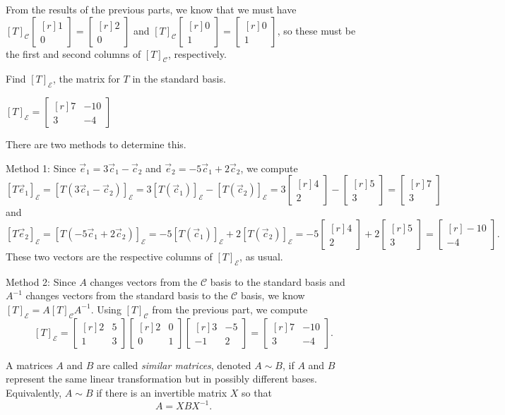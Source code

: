 \documentclass{problemset}
\newcommand{\xhat}{{\vec e_1}}
\newcommand{\yhat}{{\vec e_2}}
\newcommand{\mat}[1]{\begin{bmatrix*}[r]#1\end{bmatrix*}}
\begin{document}
\begin{parts}[resume]
\begin{solution}
				From the results of the previous parts, we know that we must have
				$[T]_{\mathcal C}\mat{1\\0}=\mat{2\\0}$ and
				$[T]_{\mathcal C}\mat{0\\1}=\mat{0\\1}$, so these
				must be the first and second columns of $[T]_{\mathcal C}$, respectively.
			\end{solution}
		\item Find $[T]_{\mathcal E}$, the matrix for $T$ in the standard basis.
			\begin{solution}
				$[T]_{\mathcal E}=\mat{7&-10\\3&-4}$

				There are two methods to determine this.

				Method 1:
				Since $\xhat=3\vec c_1-\vec c_2$ and $\yhat=-5\vec c_1+2\vec c_2$,
				we compute
				\[
					[T\xhat]_{\mathcal E}
					=[T(3\vec c_1-\vec c_2)]_{\mathcal E}
					=3[T(\vec c_1)]_{\mathcal E}-[T(\vec c_2)]_{\mathcal E}
					=3\mat{4\\2}-\mat{5\\3}
					=\mat{7\\3}
				\]
				and
				\[
					[T\yhat]_{\mathcal E}
					=[T(-5\vec c_1+2\vec c_2)]_{\mathcal E}
					=-5[T(\vec c_1)]_{\mathcal E}+2[T(\vec c_2)]_{\mathcal E}
					=-5\mat{4\\2}+2\mat{5\\3}
					=\mat{-10\\-4}.
				\]
				These two vectors are the respective columns of $[T]_{\mathcal E}$,
				as usual.

				Method 2:
				Since $A$ changes vectors from the $\mathcal C$ basis to the standard
				basis and $A^{-1}$ changes vectors from the standard basis to the
				$\mathcal C$ basis, we know $[T]_{\mathcal E} = A[T]_{\mathcal C}A^{-1}$.
				Using $[T]_{\mathcal C}$ from the previous part, we compute
				\[
					[T]_{\mathcal E}
					=\mat{2&5\\1&3}\mat{2&0\\0&1}\mat{3&-5\\-1&2}
					=\mat{7&-10\\3&-4}.
				\]


			\end{solution}
	\end{parts}
	\begin{definition}
		A matrices $A$ and $B$ are called \emph{similar matrices}, denoted $A\sim B$, if
		$A$ and $B$ represent the same linear transformation but in possibly different bases.
		Equivalently, $A\sim B$ if there is an invertible matrix $X$ so that
		\[
			A=XBX^{-1}.
		\]
	\end{definition}
\end{document}
